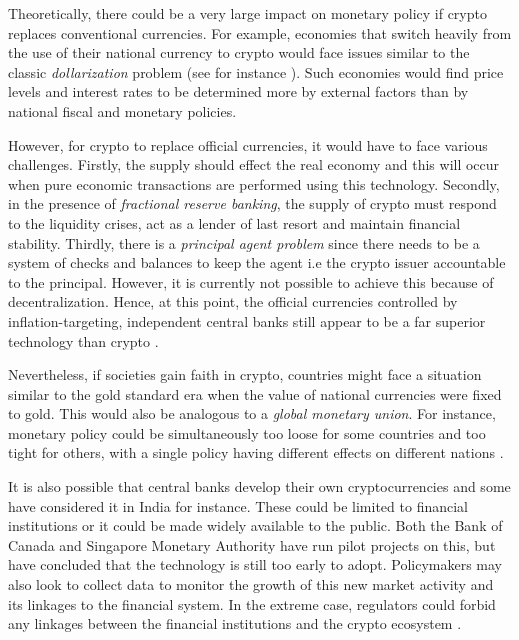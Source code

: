 \documentclass[12pt]{article}
\newcommand{\1}{\mathbbm 1}
\begin{document}
		
		Theoretically, there could be a very large impact on monetary policy if crypto replaces conventional currencies. For example, economies that switch heavily from the use of their national currency to crypto would face issues similar to the classic \textit{dollarization} problem (see for instance \cite{calvo2002dollarization}). Such economies would find price levels and interest rates to be determined more by external factors than by national fiscal and monetary policies.
		
		However, for crypto to replace official currencies, it would have to face various challenges. Firstly, the supply should effect the real economy and this will occur when pure economic transactions are performed using this technology. Secondly, in the presence of \textit{fractional reserve banking}, the supply of crypto must respond to the liquidity crises, act as a lender of last resort and maintain financial stability. Thirdly, there is a \textit{principal agent problem} since there needs to be a system of checks and balances to keep the agent i.e the crypto issuer accountable to the principal. However, it is currently not possible to achieve this because of decentralization. Hence, at this point, the official currencies controlled by inflation-targeting, independent central banks still appear to be a far superior technology than crypto \cite{claeys2018crypto}.
		
		
		Nevertheless, if societies gain faith in crypto, countries might face a situation similar to the gold standard era when the value of national currencies were fixed to gold. This would also be analogous to a \textit{global monetary union}. For instance, monetary policy could be simultaneously too loose for some countries and too tight for others, with a single policy having different effects on different nations \cite{oliverwyman2018}.
	
		
		
		It is also possible that central banks develop their own cryptocurrencies and some have considered it in India for instance. These could be limited to financial institutions or it could be made widely available to the public. Both the Bank of Canada and Singapore Monetary Authority have run pilot projects on this, but have concluded that the technology is still too early to adopt. Policymakers may also look to collect data to monitor the growth of this new market activity and its linkages to the financial system. In the extreme case, regulators could forbid any linkages between the financial institutions and the crypto ecosystem \cite{oliverwyman2018}.
		
\end{document}
